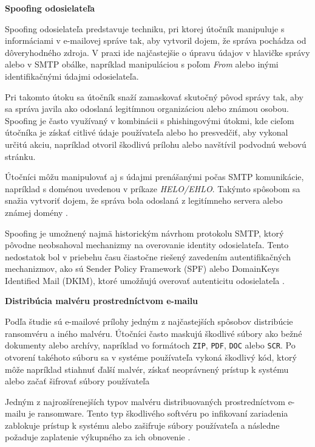\documentclass[conference]{IEEEtran}
\begin{document}
\textbf{Spoofing odosielateľa}

Spoofing odosielateľa predstavuje techniku, pri ktorej útočník
manipuluje s informáciami v e-mailovej správe tak, aby vytvoril
dojem, že správa pochádza od dôveryhodného zdroja. V praxi ide
najčastejšie o úpravu údajov v hlavičke správy alebo v SMTP
obálke, napríklad manipuláciou s poľom \textit{From} alebo
inými identifikačnými údajmi odosielateľa\cite{karim2019spam}.

Pri takomto útoku sa útočník snaží zamaskovať skutočný pôvod
správy tak, aby sa správa javila ako odoslaná legitímnou
organizáciou alebo známou osobou. Spoofing je často využívaný
v kombinácii s phishingovými útokmi, kde cieľom útočníka je
získať citlivé údaje používateľa alebo ho presvedčiť, aby
vykonal určitú akciu, napríklad otvoril škodlivú prílohu alebo
navštívil podvodnú webovú stránku\cite{karim2019spam}.

Útočníci môžu manipulovať aj s údajmi prenášanými počas SMTP
komunikácie, napríklad s doménou uvedenou v príkaze
\textit{HELO/EHLO}. Takýmto spôsobom sa snažia vytvoriť dojem,
že správa bola odoslaná z legitímneho servera alebo známej
domény \cite{karim2019spam}.

Spoofing je umožnený najmä historickým návrhom protokolu SMTP,
ktorý pôvodne neobsahoval mechanizmy na overovanie identity
odosielateľa. Tento nedostatok bol v priebehu času čiastočne
riešený zavedením autentifikačných mechanizmov, ako sú
Sender Policy Framework (SPF) alebo DomainKeys Identified
Mail (DKIM), ktoré umožňujú overovať autenticitu odosielateľa
\cite{karim2019spam}.

\textbf{Distribúcia malvéru prostredníctvom e-mailu}

Podľa študie sú e-mailové prílohy jedným z najčastejších
spôsobov distribúcie ransomvéru a iného malvéru. Útočníci často
maskujú škodlivé súbory ako bežné dokumenty alebo archívy,
napríklad vo formátoch \texttt{ZIP}, \texttt{PDF}, \texttt{DOC} alebo
\texttt{SCR}. Po otvorení takéhoto súboru sa v systéme používateľa
vykoná škodlivý kód, ktorý môže napríklad stiahnuť ďalší malvér,
získať neoprávnený prístup k systému alebo začať šifrovať súbory
používateľa \cite{aurangzeb2017ransomware}

Jedným z najrozšírenejších typov malvéru distribuovaných prostredníctvom
e-mailu je ransomware. Tento typ škodlivého softvéru po infikovaní
zariadenia zablokuje prístup k systému alebo zašifruje súbory
používateľa a následne požaduje zaplatenie výkupného za ich
obnovenie
\cite{aurangzeb2017ransomware}. 
\end{document}

